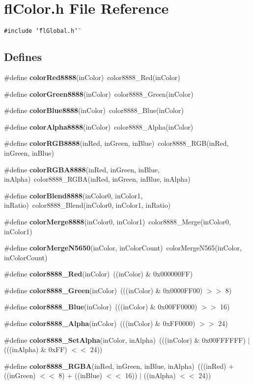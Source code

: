 \section{fl\-Color.h File Reference}
\label{flColor_8h}
{\tt \#include \char`\"{}fl\-Global.h\char`\"{}}\par
\subsection*{Defines}
\begin{CompactItemize}
\item 
\#define {\bf color\-Red8888}(in\-Color)~color8888\_\-Red(in\-Color)
\item 
\#define {\bf color\-Green8888}(in\-Color)~color8888\_\-Green(in\-Color)
\item 
\#define {\bf color\-Blue8888}(in\-Color)~color8888\_\-Blue(in\-Color)
\item 
\#define {\bf color\-Alpha8888}(in\-Color)~color8888\_\-Alpha(in\-Color)
\item 
\#define {\bf color\-RGB8888}(in\-Red, in\-Green, in\-Blue)~color8888\_\-RGB(in\-Red, in\-Green, in\-Blue)
\item 
\#define {\bf color\-RGBA8888}(in\-Red, in\-Green, in\-Blue, in\-Alpha)~color8888\_\-RGBA(in\-Red, in\-Green, in\-Blue, in\-Alpha)
\item 
\#define {\bf color\-Blend8888}(in\-Color0, in\-Color1, in\-Ratio)~color8888\_\-Blend(in\-Color0, in\-Color1, in\-Ratio)
\item 
\#define {\bf color\-Merge8888}(in\-Color0, in\-Color1)~color8888\_\-Merge(in\-Color0, in\-Color1)
\item 
\#define {\bf color\-Merge\-N5650}(in\-Color, in\-Color\-Count)~color\-Merge\-N565(in\-Color, in\-Color\-Count)
\item 
\#define {\bf color8888\_\-Red}(in\-Color)~((in\-Color) \& 0x000000FF)
\item 
\#define {\bf color8888\_\-Green}(in\-Color)~(((in\-Color) \& 0x0000FF00) $>$$>$ 8)
\item 
\#define {\bf color8888\_\-Blue}(in\-Color)~(((in\-Color) \& 0x00FF0000) $>$$>$ 16)
\item 
\#define {\bf color8888\_\-Alpha}(in\-Color)~(((in\-Color) \& 0x\-FF0000) $>$$>$ 24)
\item 
\#define {\bf color8888\_\-Set\-Alpha}(in\-Color, in\-Alpha)~(((in\-Color) \& 0x00FFFFFF) $|$ (((in\-Alpha) \& 0x\-FF) $<$$<$ 24))
\item 
\#define {\bf color8888\_\-RGBA}(in\-Red, in\-Green, in\-Blue, in\-Alpha)~(((in\-Red) + ((in\-Green) $<$$<$ 8) + ((in\-Blue) $<$$<$ 16)) $|$ ((in\-Alpha) $<$$<$ 24))
$$
\end{CompactItemize}
